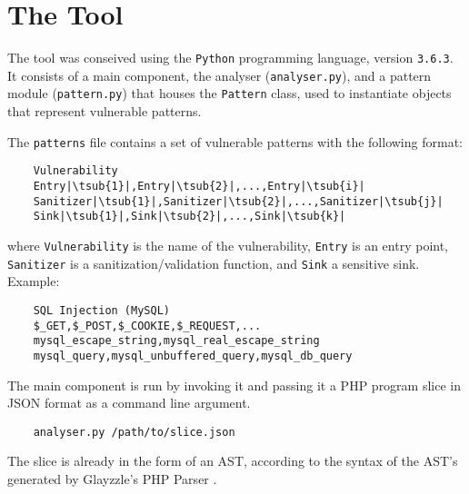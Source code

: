 \section{The Tool}
\label{sec:tool}

The tool was conseived using the \verb|Python| programming language, version
\verb|3.6.3|. It consists of a main component, the analyser
(\verb|analyser.py|), and a pattern module (\verb|pattern.py|) that houses the
\verb|Pattern| class, used to instantiate objects that represent vulnerable
patterns.

The \verb|patterns| file contains a set of vulnerable patterns with the
following format:

\begin{lstlisting}
    Vulnerability
    Entry|\tsub{1}|,Entry|\tsub{2}|,...,Entry|\tsub{i}|
    Sanitizer|\tsub{1}|,Sanitizer|\tsub{2}|,...,Sanitizer|\tsub{j}|
    Sink|\tsub{1}|,Sink|\tsub{2}|,...,Sink|\tsub{k}|
\end{lstlisting}

where \verb|Vulnerability| is the name of the vulnerability, \verb|Entry| is an
entry point, \verb|Sanitizer| is a sanitization/validation function, and
\verb|Sink| a sensitive sink. Example:

\begin{verbatim}
    SQL Injection (MySQL)
    $_GET,$_POST,$_COOKIE,$_REQUEST,...
    mysql_escape_string,mysql_real_escape_string
    mysql_query,mysql_unbuffered_query,mysql_db_query
\end{verbatim}

The main component is run by invoking it and passing it a PHP program slice in
JSON format as a command line argument.

\begin{verbatim}
    analyser.py /path/to/slice.json
\end{verbatim}

The slice is already in the form of an AST, according to the syntax of the AST's
generated by Glayzzle's PHP Parser \cite{glayzzle-php}.